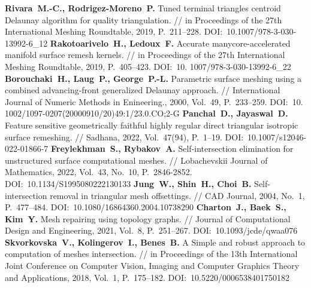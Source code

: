 \begin{thebibliography}{99}
%
\textbf{Rivara~M.-C., Rodrigez-Moreno~P.} Tuned terminal triangles centroid Delaunay algorithm for quality triangulation. // in Proceedings of the 27th International Meshing Roundtable, 2019, P.~211–228. DOI:~10.1007/978-3-030-13992-6\_12
%
\textbf{Rakotoarivelo~H., Ledoux~F.} Accurate manycore-accelerated manifold surface remesh kernels. // in Proceedings of the 27th International Meshing Roundtable, 2019, P.~405–423. DOI:~10.
1007/978-3-030-13992-6\_22
%
\textbf{Borouchaki~H., Laug~P., George~P.-L.} Parametric surface meshing using a combined advancing-front generalized Delaunay approach. // International Journal of Numeric Methods in Enineering., 2000, Vol.~49, P.~233–259. DOI:~10.
1002/1097-0207(20000910/20)49:1/23.0.CO;2-G
%
\textbf{Panchal~D., Jayaswal~D.} Feature sensitive geometrically faithful highly regular direct 
triangular isotropic surface remeshing. // Sadhana, 2022, Vol.~47(94), P.~1–19. DOI:~10.1007/s12046-022-01866-7
%
\textbf{Freylekhman~S., Rybakov~A.} Self-intersection elimination for unstructured surface computational meshes. // Lobachevskii Journal of Mathematics, 2022, Vol.~43, No.~10, P.~2846-2852. DOI:~10.1134/S1995080222130133
%
\textbf{Jung~W., Shin~H., Choi~B.} Self-intersection removal in triangular mesh offsettings. // CAD Journal, 2004, No.~1, P.~477–484. DOI:~10.1080/16864360.2004.10738290
%
\textbf{Charton~J., Baek~S., Kim~Y.} Mesh repairing using topology graphs. // Journal of Computational Design and Engineering, 2021, Vol.~8, P.~251–267. DOI:~10.1093/jcde/qwaa076
%
\textbf{Skvorkovska~V., Kolingerov~I., Benes~B.} A Simple and robust approach to computation of meshes intersection. // in Proceedings of the 13th International Joint Conference on Computer Vision, Imaging and Computer Graphics Theory and Applications, 2018, Vol.~1, P.~175–182. DOI:~10.5220/0006538401750182
%




\end{thebibliography}
